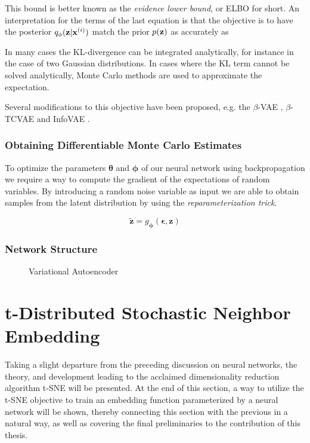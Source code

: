 This bound is better known as the \textit{evidence lower bound}, or ELBO for short. An interpretation for the terms of the last equation is that the objective is to have the posterior $q_{\mathbf{\phi}}(\mathbf{z} \vert \mathbf{x}^{(i)})$ match the prior $p(\mathbf{z})$ as accurately as 

In many cases the KL-divergence can be integrated analytically, for instance in the case of two Gaussian distributions. In cases where the KL term cannot be solved analytically, Monte Carlo methods are used to approximate the expectation.

Several modifications to this objective have been proposed, e.g. the $\beta$-VAE \cite{beta_vae, understanding_beta_vae}, $\beta$-TCVAE \cite{beta_tcvae} and InfoVAE \cite{infovae}.

\subsubsection{Obtaining Differentiable Monte Carlo Estimates}

To optimize the parameters $\mathbf{\theta}$ and $\mathbf{\phi}$ of our neural network using backpropagation we require a way to compute the gradient of the expectations of random variables. By introducing a random noise variable as input we are able to obtain samples from the latent distribution by using the \textit{reparameterization trick}.

$$\widetilde{\mathbf{z}} = g_{\mathbf{\phi}}(\mathbf{\epsilon}, \mathbf{z})$$

\subsubsection{Network Structure}

\begin{figure}[!htb]
  \centering
  \resizebox{\textwidth}{!}{\unskip}
  \caption{Variational Autoencoder}
  \label{fig:vae}
\end{figure}

\cite{normalizing_flows, inverse_autoregressive_flow, householder_flow}

\newpage \phantom{x}
\newpage \phantom{x}
\newpage

\section{t-Distributed Stochastic Neighbor Embedding}
\label{section:tsne}

Taking a slight departure from the preceding discussion on neural networks, the theory, and development leading to the acclaimed dimensionality reduction algorithm t-SNE will be presented. At the end of this section, a way to utilize the t-SNE objective to train an embedding function parameterized by a neural network will be shown, thereby connecting this section with the previous in a natural way, as well as covering the final preliminaries to the contribution of this thesis.

